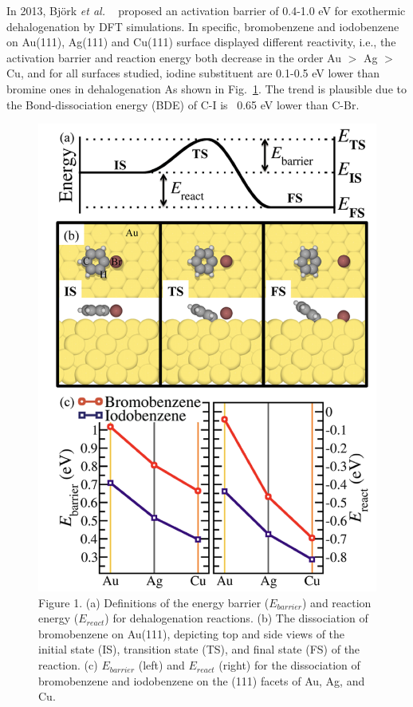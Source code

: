 \documentclass[%
 reprint,
 amsmath,amssymb,
 aps,
prb,
]{revtex4-2}
\begin{document}
In 2013, Björk \textit{et al.} ~\cite{jacs2013} proposed an activation barrier of 0.4-1.0 eV for exothermic dehalogenation by DFT simulations. In specific, bromobenzene and iodobenzene on Au(111), Ag(111) and Cu(111) surface displayed different reactivity, i.e., the activation barrier and reaction energy both decrease in the order Au $>$ Ag $>$ Cu, and for all surfaces studied, iodine substituent are 0.1-0.5 eV lower than bromine ones in dehalogenation As shown in Fig.~\ref{fig:dehalo}. The trend is plausible due to the Bond-dissociation energy (BDE) of C-I is ~0.65 eV lower than C-Br\cite{Arpc1982}.

\begin{figure}[tbh]
\centering
\includegraphics[width=0.75\columnwidth]{Fig/dehalogentaion.png}
\caption{Figure 1. (a) Definitions of the energy barrier ($E_{barrier}$) and reaction energy ($E_{react}$) for dehalogenation reactions. (b) The dissociation of bromobenzene on Au(111), depicting top and side views of the initial state (IS), transition state (TS), and final state (FS) of the reaction. (c) $E_{barrier}$ (left) and $E_{react}$ (right) for the dissociation of bromobenzene and iodobenzene on the (111) facets of Au, Ag, and Cu.} 
\label{fig:dehalo}
\end{figure}
\end{document}
